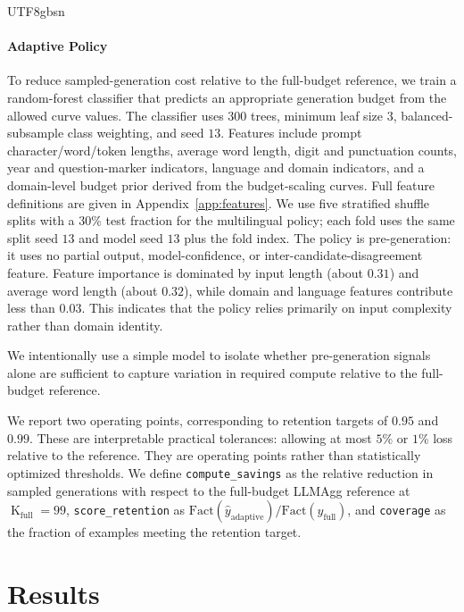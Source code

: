 \documentclass[11pt]{article}
\begin{document}
\begin{CJK*}{UTF8}{gbsn}
\paragraph{Adaptive Policy}

To reduce sampled-generation cost relative to the full-budget reference, we train a random-forest classifier that predicts an appropriate generation budget from the allowed curve values. The classifier uses $300$ trees, minimum leaf size $3$, balanced-subsample class weighting, and seed $13$. Features include prompt character/word/token lengths, average word length, digit and punctuation counts, year and question-marker indicators, language and domain indicators, and a domain-level budget prior derived from the budget-scaling curves. Full feature definitions are given in Appendix~\ref{app:features}. We use five stratified shuffle splits with a $30$\% test fraction for the multilingual policy; each fold uses the same split seed $13$ and model seed $13$ plus the fold index. The policy is pre-generation: it uses no partial output, model-confidence, or inter-candidate-disagreement feature. Feature importance is dominated by input length (about $0.31$) and average word length (about $0.32$), while domain and language features contribute less than $0.03$. This indicates that the policy relies primarily on input complexity rather than domain identity.

We intentionally use a simple model to isolate whether pre-generation signals alone are sufficient to capture variation in required compute relative to the full-budget reference.

We report two operating points, corresponding to retention targets of $0.95$ and $0.99$. These are interpretable practical tolerances: allowing at most $5$\% or $1$\% loss relative to the reference. They are operating points rather than statistically optimized thresholds. We define \texttt{compute\_savings} as the relative reduction in sampled generations with respect to the full-budget LLMAgg reference at $\operatorname{K}_{\text{full}}=99$, \texttt{score\_retention} as $\mathrm{Fact}(\hat{y}_{\text{adaptive}}) / \mathrm{Fact}(\hat{y}_{\text{full}})$, and \texttt{coverage} as the fraction of examples meeting the retention target.

\section{Results}


\end{CJK*}
\end{document}
